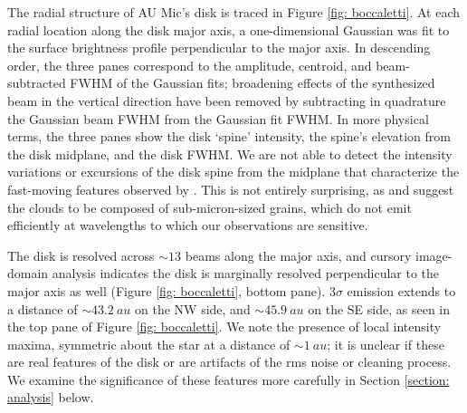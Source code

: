 \documentclass[12pt,oneside]{article}
\begin{document}
The radial structure of AU Mic's disk is traced in Figure \ref{fig: boccaletti}. 
At each radial location along the disk major axis, a one-dimensional Gaussian was fit to the surface brightness profile perpendicular to the major axis.
In descending order, the three panes correspond to the amplitude, centroid, and beam-subtracted FWHM of the Gaussian fits; broadening effects of the synthesized beam in the vertical direction have been removed by subtracting in quadrature the Gaussian beam FWHM from the Gaussian fit FWHM.
In more physical terms, the three panes show the disk `spine' intensity, the spine's elevation from the disk midplane, and the disk FWHM.
We are not able to detect the intensity variations or excursions of the disk spine from the midplane that characterize the fast-moving features observed by \cite{boccaletti15}.
This is not entirely surprising, as \cite{sezestre17} and \cite{chiang&fung17} suggest the clouds to be composed of sub-micron-sized grains, which do not emit efficiently at wavelengths to which our observations are sensitive.

The disk is resolved across $\sim13$ beams along the major axis, and cursory image-domain analysis indicates the disk is marginally resolved perpendicular to the major axis as well (Figure \ref{fig: boccaletti}, bottom pane).
$3\sigma$ emission extends to a distance of $\sim \SI{43.2}{au}$ on the NW side, and $\sim \SI{45.9}{au}$ on the SE side, as seen in the top pane of Figure \ref{fig: boccaletti}. 
We note the presence of local intensity maxima, symmetric about the star at a distance of $\sim \SI{1}{au}$; it is unclear if these are real features of the disk or are artifacts of the rms noise or cleaning process. 
We examine the significance of these features more carefully in Section \ref{section: analysis} below.
\end{document}
